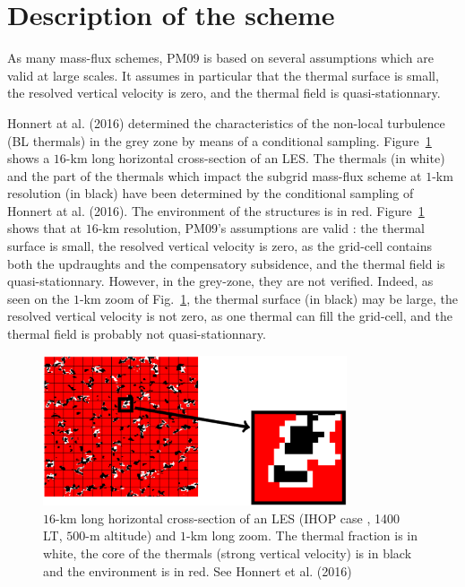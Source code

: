 \section{Description of the scheme}

As many mass-flux schemes, PM09 is based on several assumptions which are valid at large scales. It assumes in particular that the thermal surface is small, the resolved vertical velocity is zero, and the thermal field is quasi-stationnary. 

Honnert at al. (2016) determined the characteristics of the non-local turbulence (BL thermals) in the grey zone by means of a conditional sampling. Figure~\ref{f01} shows a $16$-km long horizontal cross-section of an LES. The thermals (in white) and the part of the thermals which impact the subgrid mass-flux scheme at $1$-km resolution (in black) have been determined by the conditional sampling of Honnert at al. (2016). The environment of the structures is in red. Figure~\ref{f01} shows that at $16$-km resolution, PM09's assumptions are valid : the thermal surface is small, the resolved vertical velocity is zero, as the grid-cell contains both the updraughts and the compensatory subsidence, and the thermal field is quasi-stationnary. However, in the grey-zone, they are not verified. Indeed, as seen on the $1$-km zoom of Fig.~\ref{f01}, the thermal surface (in black) may be large, the resolved vertical velocity is not zero, as one thermal can fill the grid-cell, and the thermal field is probably not quasi-stationnary.   
\begin{figure}[h!]
	\centering
	\includegraphics[width=0.8\textwidth]{EPS/f01}
	\caption{\label{f01}$16$-km long horizontal cross-section of an LES (IHOP case , 1400 LT, $500$-m altitude) and $1$-km long zoom. The thermal fraction is in white, the core of the thermals (strong vertical velocity) is in black and the environment is in red. See Honnert et al. (2016)}
\end{figure}

